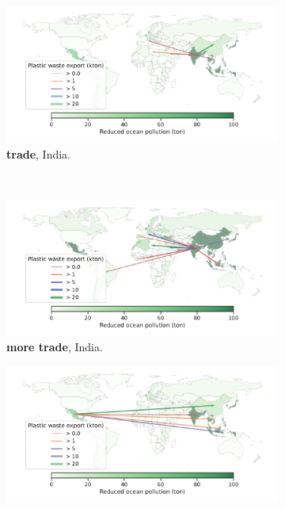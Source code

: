 \documentclass[dvipsnames]{article}
\begin{document}
\begin{figure}
\centering
\begin{subfigure}{0.47\textwidth}
    \centering
    \includegraphics[width=\textwidth]{figures/ind_trade_export_w1.pdf}
    \caption{\textbf{trade}, India.}
\end{subfigure}
~
\begin{subfigure}{0.47\textwidth}
    \centering
    \includegraphics[width=\textwidth]{figures/ind_trade_export_w10.pdf}
    \caption{\textbf{more trade}, India.}
\end{subfigure}
\begin{subfigure}{0.47\textwidth}
    \centering
    \includegraphics[width=\textwidth]{figures/mex_trade_export_w1.pdf}

\end{subfigure}
\end{figure}
\end{document}
